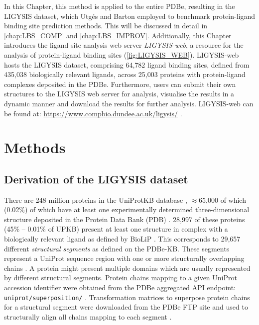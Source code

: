 In this Chapter, this method is applied to the entire PDBe, resulting in the LIGYSIS dataset, which Utgés and Barton \cite{UTGES_2024_LBSCOMP} employed to benchmark protein-ligand binding site prediction methods. This will be discussed in detail in \autoref{chap:LBS_COMP} and \autoref{chap:LBS_IMPROV}. Additionally, this Chapter introduces the ligand site analysis web server \textit{LIGYSIS-web}, a resource for the analysis of protein-ligand binding sites (\autoref{fig:LIGYSIS_WEB}). LIGYSIS-web hosts the LIGYSIS dataset, comprising 64,782 ligand binding sites, defined from 435,038 biologically relevant ligands, across 25,003 proteins with protein-ligand complexes deposited in the PDBe. Furthermore, users can submit their own structures to the LIGYSIS web server for analysis, visualise the results in a dynamic manner and download the results for further analysis. LIGYSIS-web can be found at: \url{https://www.compbio.dundee.ac.uk/ligysis/} \cite{LIGYSIS_SERVER}.

\section{Methods}

\subsection{Derivation of the LIGYSIS dataset}

There are 248 million proteins in the UniProtKB database \cite{UNIPROT_2020_UNIPROT}, $\approx$65,000 of which (0.02\%) of which have at least one experimentally determined three-dimensional structure deposited in the Protein Data Bank (PDB) \cite{ARMSTRONG_2020_PDBE}. 28,997 of these proteins (45\% -- 0.01\% of UPKB) present at least one structure in complex with a biologically relevant ligand as defined by BioLiP \cite{YANG_2013_BIOLIP}. This corresponds to 29,657 different \textit{structural segments} as defined on the PDBe-KB. These segments represent a UniProt sequence region with one or more structurally overlapping chains  \cite{ELLAWAY_2024_CONFORMATIONS}. A protein might present multiple domains which are usually represented by different structural segments. Protein chains mapping to a given UniProt accession identifier were obtained from the PDBe aggregated API endpoint: \texttt{uniprot/superposition/} \cite{SUPP_ENDPOINT, PDBEKB_2019_PDBEKB}. Transformation matrices to superpose protein chains for a structural segment were downloaded from the PDBe FTP site \cite{SUPP_FTP_ENDPOINT} and used to structurally align all chains mapping to each segment \cite{PDBE_2022_PDBEKB}.

